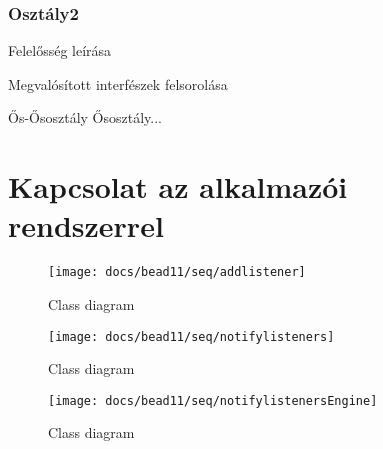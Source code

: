 \documentclass[../../projlab]{subfiles}
\begin{document}
\subsubsection{Osztály2}
\begin{class-template-responsibility}
    Felelősség leírása
\end{class-template-responsibility}
\begin{class-template-interface}
    Megvalósított interfészek felsorolása
\end{class-template-interface}
\begin{class-template-baseclass}
    Ős-Ősosztály \baseclass Ősosztály... 
\end{class-template-baseclass}
\begin{class-template-attribute}
\end{class-template-attribute}
\begin{class-template-method}
\end{class-template-method}

\section{Kapcsolat az alkalmazói rendszerrel}
\begin{figure}[H] 
    \centering 
    \texttt{[image: docs/bead11/seq/addlistener]} 
    \caption{Class diagram} 
\end{figure} 

\begin{figure}[H] 
    \centering 
    \texttt{[image: docs/bead11/seq/notifylisteners]} 
    \caption{Class diagram} 
\end{figure} 

\begin{figure}[H] 
    \centering 
    \texttt{[image: docs/bead11/seq/notifylistenersEngine]} 
    \caption{Class diagram} 
\end{figure} 
\end{document}
